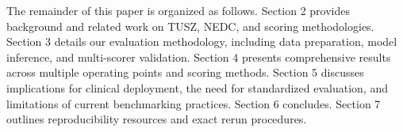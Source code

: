 \documentclass[10pt]{article}
\begin{document}
The remainder of this paper is organized as follows. Section 2 provides background and related work on TUSZ, NEDC, and scoring methodologies. Section 3 details our evaluation methodology, including data preparation, model inference, and multi-scorer validation. Section 4 presents comprehensive results across multiple operating points and scoring methods. Section 5 discusses implications for clinical deployment, the need for standardized evaluation, and limitations of current benchmarking practices. Section 6 concludes. Section 7 outlines reproducibility resources and exact rerun procedures.
\end{document}
